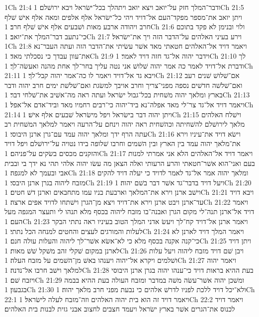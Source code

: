 1Ch 21:4  ודבר־המלך חזק על־יואב ויצא יואב ויתהלך בכל־ישׂראל ויבא ירושׁלם׃
1Ch 21:5  ויתן יואב את־מספר מפקד־העם אל־דויד ויהי כל־ישׂראל אלף אלפים ומאה אלף אישׁ שׁלף חרב ויהודה ארבע מאות ושׁבעים אלף אישׁ שׁלף חרב׃
1Ch 21:6  ולוי ובנימן לא פקד בתוכם כי־נתעב דבר־המלך את־יואב׃
1Ch 21:7  וירע בעיני האלהים על־הדבר הזה ויך את־ישׂראל׃
1Ch 21:8  ויאמר דויד אל־האלהים חטאתי מאד אשׁר עשׂיתי את־הדבר הזה ועתה העבר־נא את־עוון עבדך כי נסכלתי מאד׃
1Ch 21:9  וידבר יהוה אל־גד חזה דויד לאמר׃
1Ch 21:10  לך ודברת אל־דויד לאמר כה אמר יהוה שׁלושׁ אני נטה עליך בחר־לך אחת מהנה ואעשׂה־לך׃
1Ch 21:11  ויבא גד אל־דויד ויאמר לו כה־אמר יהוה קבל־לך׃
1Ch 21:12  אם־שׁלושׁ שׁנים רעב ואם־שׁלשׁה חדשׁים נספה מפני־צריך וחרב אויבך למשׂגת ואם־שׁלשׁת ימים חרב יהוה ודבר בארץ ומלאך יהוה משׁחית בכל־גבול ישׂראל ועתה ראה מה־אשׁיב את־שׁלחי דבר׃
1Ch 21:13  ויאמר דויד אל־גד צר־לי מאד אפלה־נא ביד־יהוה כי־רבים רחמיו מאד וביד־אדם אל־אפל׃
1Ch 21:14  ויתן יהוה דבר בישׂראל ויפל מישׂראל שׁבעים אלף אישׁ׃
1Ch 21:15  וישׁלח האלהים מלאך לירושׁלם להשׁחיתה וכהשׁחית ראה יהוה וינחם על־הרעה ויאמר למלאך המשׁחית רב עתה הרף ידך ומלאך יהוה עמד עם־גרן ארנן היבוסי׃
1Ch 21:16  וישׂא דויד את־עיניו וירא את־מלאך יהוה עמד בין הארץ ובין השׁמים וחרבו שׁלופה בידו נטויה על־ירושׁלם ויפל דויד והזקנים מכסים בשׂקים על־פניהם׃
1Ch 21:17  ויאמר דויד אל־האלהים הלא אני אמרתי למנות בעם ואני־הוא אשׁר־חטאתי והרע הרעותי ואלה הצאן מה עשׂו יהוה אלהי תהי נא ידך בי ובבית אבי ובעמך לא למגפה׃
1Ch 21:18  ומלאך יהוה אמר אל־גד לאמר לדויד כי יעלה דויד להקים מזבח ליהוה בגרן ארנן היבסי׃
1Ch 21:19  ויעל דויד בדבר־גד אשׁר דבר בשׁם יהוה׃
1Ch 21:20  וישׁב ארנן וירא את־המלאך וארבעת בניו עמו מתחבאים וארנן דשׁ חטים׃
1Ch 21:21  ויבא דויד עד־ארנן ויבט ארנן וירא את־דויד ויצא מן־הגרן וישׁתחו לדויד אפים ארצה׃
1Ch 21:22  ויאמר דויד אל־ארנן תנה־לי מקום הגרן ואבנה־בו מזבח ליהוה בכסף מלא תנהו לי ותעצר המגפה מעל העם׃
1Ch 21:23  ויאמר ארנן אל־דויד קח־לך ויעשׂ אדני המלך הטוב בעיניו ראה נתתי הבקר לעלות והמורגים לעצים והחטים למנחה הכל נתתי׃
1Ch 21:24  ויאמר המלך דויד לארנן לא כי־קנה אקנה בכסף מלא כי לא־אשׂא אשׁר־לך ליהוה והעלות עולה חנם׃
1Ch 21:25  ויתן דויד לארנן במקום שׁקלי זהב משׁקל שׁשׁ מאות׃
1Ch 21:26  ויבן שׁם דויד מזבח ליהוה ויעל עלות ושׁלמים ויקרא אל־יהוה ויענהו באשׁ מן־השׁמים על מזבח העלה׃
1Ch 21:27  ויאמר יהוה למלאך וישׁב חרבו אל־נדנה׃
1Ch 21:28  בעת ההיא בראות דויד כי־ענהו יהוה בגרן ארנן היבוסי ויזבח שׁם׃
1Ch 21:29  ומשׁכן יהוה אשׁר־עשׂה משׁה במדבר ומזבח העולה בעת ההיא בבמה בגבעון׃
1Ch 21:30  ולא־יכל דויד ללכת לפניו לדרשׁ אלהים כי נבעת מפני חרב מלאך יהוה׃
1Ch 22:1  ויאמר דויד זה הוא בית יהוה האלהים וזה־מזבח לעלה לישׂראל׃
1Ch 22:2  ויאמר דויד לכנוס את־הגרים אשׁר בארץ ישׂראל ויעמד חצבים לחצוב אבני גזית לבנות בית האלהים׃
